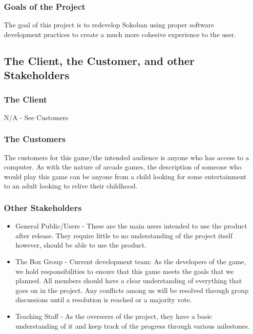\documentclass[12pt, titlepage]{article}
\begin{document}
\subsubsection{Goals of the Project}

The goal of this project is to redevelop Sokoban using proper software development practices to create a much more cohesive experience to the user. 

\subsection{The Client, the Customer, and other Stakeholders}

\subsubsection{The Client}
N/A - See Customers

\subsubsection{The Customers}

The customers for this game/the intended audience is anyone who has access to a computer. As with the nature of arcade games, the description of someone who would play this game can be anyone from a child looking for some entertainment to an adult looking to relive their childhood.

\subsubsection{Other Stakeholders}

\begin{itemize}
    \item General Public/Users - 
    These are the main users intended to use the product after release. They require little to no understanding of the project itself however, should be able to use the product.
    \item The Box Group - Current development team: As the developers of the game, we hold responsibilities to ensure that this game meets the goals that we planned. All members should have a clear understanding of everything that goes on in the project. Any conflicts among us will be resolved through group discussions until a resolution is reached or a majority vote.
    \item Teaching Staff - As the overseers of the project, they have a basic understanding of it and keep track of the progress through various milestones.
\end{itemize}
\end{document}
